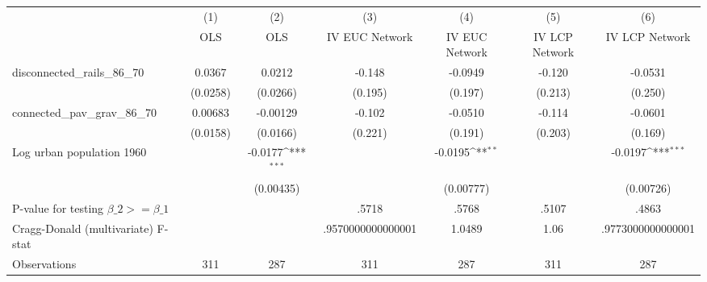 {
\def\sym#1{\ifmmode^{#1}\else\(^{#1}\)\fi}
\begin{tabular}{l*{6}{c}}
\hline\hline
                &\multicolumn{1}{c}{(1)}&\multicolumn{1}{c}{(2)}&\multicolumn{1}{c}{(3)}&\multicolumn{1}{c}{(4)}&\multicolumn{1}{c}{(5)}&\multicolumn{1}{c}{(6)}\\
                &\multicolumn{1}{c}{OLS}&\multicolumn{1}{c}{OLS}&\multicolumn{1}{c}{IV EUC Network}&\multicolumn{1}{c}{IV EUC Network}&\multicolumn{1}{c}{IV LCP Network}&\multicolumn{1}{c}{IV LCP Network}\\
\hline
disconnected\_rails\_86\_70&   0.0367         &   0.0212         &   -0.148         &  -0.0949         &   -0.120         &  -0.0531         \\
                & (0.0258)         & (0.0266)         &  (0.195)         &  (0.197)         &  (0.213)         &  (0.250)         \\
[1em]
connected\_pav\_grav\_86\_70&  0.00683         & -0.00129         &   -0.102         &  -0.0510         &   -0.114         &  -0.0601         \\
                & (0.0158)         & (0.0166)         &  (0.221)         &  (0.191)         &  (0.203)         &  (0.169)         \\
[1em]
Log urban population 1960&                  &  -0.0177\sym{***}&                  &  -0.0195\sym{**} &                  &  -0.0197\sym{***}\\
                &                  &(0.00435)         &                  &(0.00777)         &                  &(0.00726)         \\
\hline
P-value for testing $\beta\_{2} >= \beta\_{1}$&                  &                  &    .5718         &    .5768         &    .5107         &    .4863         \\
Cragg-Donald (multivariate) F-stat&                  &                  &.9570000000000001         &   1.0489         &     1.06         &.9773000000000001         \\
Observations    &      311         &      287         &      311         &      287         &      311         &      287         \\
\hline\hline
\end{tabular}
}
